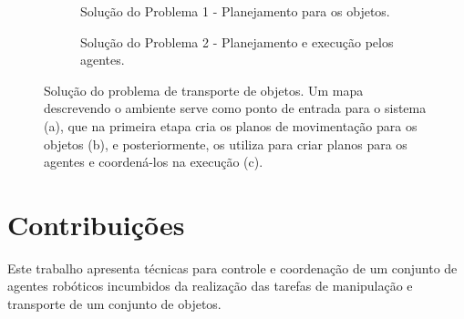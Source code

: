 \begin{figure}[htpb]
\begin{subfigure}[t]{0.32\textwidth}
		\caption{Solução do Problema 1 - Planejamento para os objetos.}
		\label{fig:diagrama_problema_1}
	\end{subfigure}
	\hspace{0.02cm}
	\begin{subfigure}[t]{0.32\textwidth}
		\centering
		\caption{Solução do Problema 2 - Planejamento e execução pelos agentes.}
		\label{fig:diagrama_problema_2}
	\end{subfigure}
	\caption[Uma solução do problema de transporte de objetos]{Solução do problema de transporte de objetos. Um mapa descrevendo o ambiente serve como ponto de entrada para o sistema (a), que na primeira etapa cria os planos de movimentação para os objetos (b), e posteriormente, os utiliza para criar planos para os agentes e coordená-los na execução (c).}
	\label{fig:diagrama_problema}
\end{figure}


\section{Contribuições} %
\label{sec:contribui_es}

Este trabalho apresenta técnicas para controle e coordenação de um conjunto de agentes robóticos incumbidos da realização das tarefas de manipulação e transporte de um conjunto de objetos.

